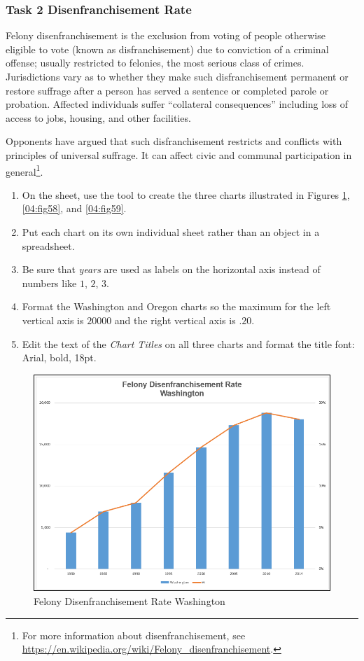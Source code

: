\subsubsection{Task 2 Disenfranchisement Rate}

Felony disenfranchisement is the exclusion from voting of people otherwise eligible to vote (known as disfranchisement) due to conviction of a criminal offense; usually restricted to felonies, the most serious class of crimes. Jurisdictions vary as to whether they make such disfranchisement permanent or restore suffrage after a person has served a sentence or completed parole or probation. Affected individuals suffer ``collateral consequences'' including loss of access to jobs, housing, and other facilities.

Opponents have argued that such disfranchisement restricts and conflicts with principles of universal suffrage. It can affect civic and communal participation in general\footnote{For more information about disenfranchisement, see \url{https://en.wikipedia.org/wiki/Felony_disenfranchisement}.}.

\begin{enumerate}
	\item On the  sheet, use the  tool to create the three charts illustrated in Figures \ref{04:fig57}, \ref{04:fig58}, and \ref{04:fig59}. 
	\item Put each chart on its own individual sheet rather than an object in a spreadsheet.
	\item Be sure that \textit{years} are used as labels on the horizontal axis instead of numbers like $ 1 $, $ 2 $, $ 3 $. 
	\item Format the Washington and Oregon charts so the maximum for the left vertical axis is $ 20000 $ and the right vertical axis is $ .20 $. 
	\item Edit the text of the \textit{Chart Titles} on all three charts and format the title font: Arial, bold, 18pt.
\end{enumerate}

\begin{figure}[H]
	\centering
	\includegraphics[width=\maxwidth{.95\linewidth}]{gfx/ch04_fig57}
	\caption{Felony Disenfranchisement Rate Washington}
	\label{04:fig57}
\end{figure}

